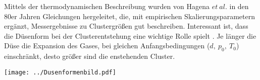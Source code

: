 Mittels der thermodynamischen Beschreibung wurden von Hagena $et\ al.$ in den 80er Jahren Gleichungen hergeleitet, die, mit empirischen Skalierungsparametern ergänzt, Messergebnisse zu Clustergrößen gut beschreiben. Interessant ist, dass die Düsenform bei der Clusterentstehung eine wichtige Rolle spielt \cite{hagena1972duseform}. Je länger die Düse die Expansion des Gases, bei gleichen Anfangsbedingungen ($d,\ p_0, \ T_0$) einschränkt, desto größer sind die enstehenden Cluster. 

\begin{center}
\begin{minipage}{\linewidth}
\centering
\texttt{[image: ../Dusenformenbild.pdf]}%
 \label{fig:Formen}
\end{minipage} 
\end{center}


